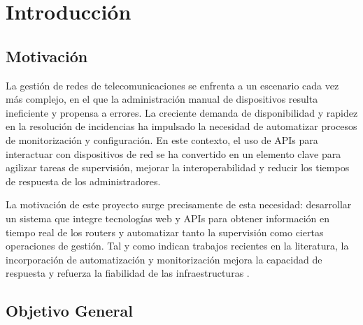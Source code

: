 
\chapter{Introducción}

\section{Motivación}

La gestión de redes de telecomunicaciones se enfrenta a un escenario cada vez más complejo, en el que la administración manual de dispositivos resulta ineficiente y propensa a errores. La creciente demanda de disponibilidad y rapidez en la resolución de incidencias ha impulsado la necesidad de automatizar procesos de monitorización y configuración. En este contexto, el uso de APIs para interactuar con dispositivos de red se ha convertido en un elemento clave para agilizar tareas de supervisión, mejorar la interoperabilidad y reducir los tiempos de respuesta de los administradores.

La motivación de este proyecto surge precisamente de esta necesidad: desarrollar un sistema que integre tecnologías web y APIs para obtener información en tiempo real de los routers y automatizar tanto la supervisión como ciertas operaciones de gestión. Tal y como indican trabajos recientes en la literatura, la incorporación de automatización y monitorización mejora la capacidad de respuesta y refuerza la fiabilidad de las infraestructuras \citep{Schummer2024}.

\section{Objetivo General}


